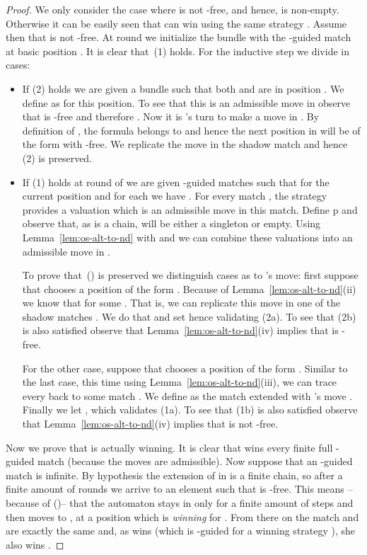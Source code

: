 \begin{proof}
We only consider the case where  is not -free, and hence,  is non-empty. Otherwise it can be easily seen that \eloise can win  using the same strategy . Assume then that  is not -free. At round  we initialize the bundle  with the -guided match  at basic position . It is clear that~(1) holds. For the inductive step we divide in cases:

\begin{itemize}
	\item If (2) holds we are given a bundle  such that both  and  are in position . We define  as  for this position. To see that this is an admissible move in  observe that  is -free and therefore . Now it is \abelard's turn to make a move in . By definition of , the formula  belongs to  and hence the next position in  will be of the form  with  -free. We replicate the move in the shadow match  and hence (2) is preserved.
\item If (1) holds at round  of  we are given -guided matches  such that for the current position  and for each  we have . 
	For every match , the strategy  provides a valuation  which is an admissible move in this match. Define p and observe that, as  is a chain,  will be either a singleton or empty. Using Lemma~\ref{lem:os-alt-to-nd} with  and  we can combine these valuations into an admissible move  in .

	To prove that~() is preserved we distinguish cases as to \abelard's move: first suppose that \abelard chooses a position of the form . Because of Lemma~\ref{lem:os-alt-to-nd}(ii) we know that  for some . That is, we can replicate this move in one of the shadow matches . We do that and set  hence validating (2a). To see that (2b) is also satisfied observe that Lemma~\ref{lem:os-alt-to-nd}(iv) implies that  is -free.

	For the other case, suppose that \abelard chooses a position of the form . Similar to the last case, this time using Lemma~\ref{lem:os-alt-to-nd}(iii), we can trace every  back to some match . We define  as the match  extended with \abelard's move . Finally we let , which validates (1a). To see that (1b) is also satisfied observe that Lemma~\ref{lem:os-alt-to-nd}(iv) implies that  is not -free.
\end{itemize}
Now we prove that  is actually winning. It is clear that \eloise wins every finite full -guided match (because the moves are admissible). Now suppose that an -guided match is infinite. By hypothesis the extension of  in  is a finite chain, so after a finite amount of rounds we arrive to an element  such that  is -free. This means --because of ()-- that the automaton stays in  only for a finite amount of steps and then moves to , at a position  which is \emph{winning} for \eloise. From there on the match  and  are exactly the same and, as \eloise wins  (which is -guided for a winning strategy ), she also wins .




\end{proof}
